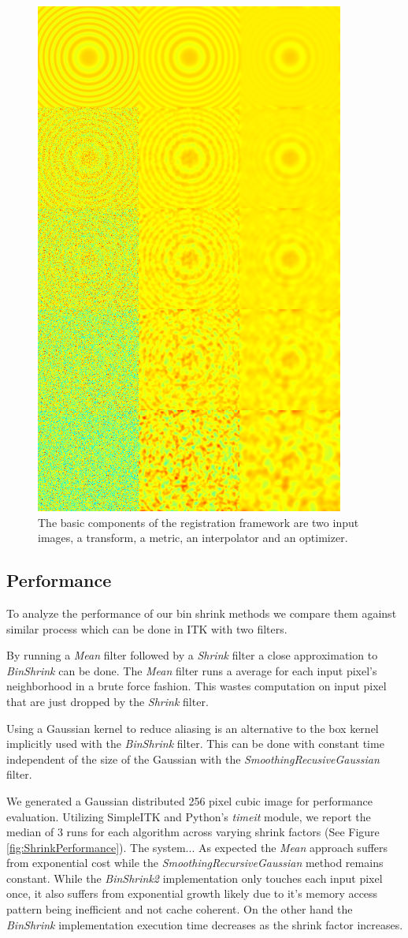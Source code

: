 \documentclass{InsightArticle}
\begin{document}
\begin{figure}
  \centering
  \includegraphics[width=0.4\linewidth]{images/gaussianshrink_hot.png}
  \caption[Registration Framework Components]{The basic components of the
    registration framework are two input images, a transform, a metric, an
    interpolator and an optimizer.}
  \label{fig:GaussianShrinkComparison}
\end{figure}

\subsection{Performance}

To analyze the performance of our bin shrink methods we compare them
against similar process which can be done in ITK with two filters.

By running a \textit{Mean} filter followed by a \textit{Shrink} filter a
close approximation to \textit{BinShrink} can be done. The
\textit{Mean} filter runs a average for each input pixel's
neighborhood in a brute force fashion. This wastes computation on input
pixel that are just dropped by the \textit{Shrink} filter.

Using a Gaussian kernel to reduce aliasing is an alternative to the box
kernel implicitly used with the \textit{BinShrink} filter. This can be
done with constant time independent of the size of the Gaussian with
the \textit{SmoothingRecusiveGaussian} filter.


We generated a Gaussian distributed 256 pixel cubic image for
performance evaluation. Utilizing SimpleITK and Python's
\textit{timeit} module, we report the median of 3 runs for each
algorithm across varying shrink factors (See Figure
\ref{fig:ShrinkPerformance}). The system... As expected the \textit{Mean} approach
suffers from exponential cost while the
\textit{SmoothingRecursiveGaussian} method remains constant. While the
\textit{BinShrink2} implementation only touches each input pixel once,
it also suffers from exponential growth likely due to it's memory
access pattern being inefficient and not cache coherent. On the other
hand the \textit{BinShrink} implementation execution time decreases as
the shrink factor increases.
\end{document}
